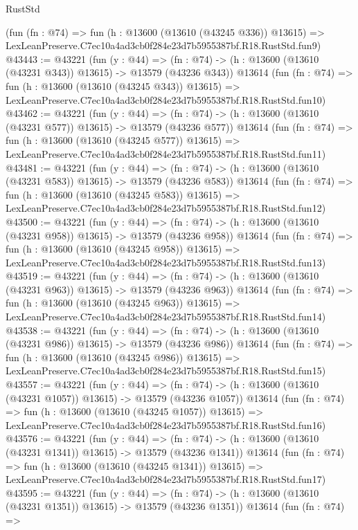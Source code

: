 \begin{lexlean}{RustStd}
\begin{coremodule}
    (fun (fn : @74) =>
    fun (h : @13600 (@13610 (@43245 @336)) @13615) =>
    LexLeanPreserve.C7ec10a4ad3cb0f284e23d7b5955387bf.R18.RustStd.fun9)
@43443 := @43221
    (fun (y : @44) =>
    (fn : @74) -> (h : @13600 (@13610 (@43231 @343)) @13615) -> @13579 (@43236 @343))
    @13614
    (fun (fn : @74) =>
    fun (h : @13600 (@13610 (@43245 @343)) @13615) =>
    LexLeanPreserve.C7ec10a4ad3cb0f284e23d7b5955387bf.R18.RustStd.fun10)
@43462 := @43221
    (fun (y : @44) =>
    (fn : @74) -> (h : @13600 (@13610 (@43231 @577)) @13615) -> @13579 (@43236 @577))
    @13614
    (fun (fn : @74) =>
    fun (h : @13600 (@13610 (@43245 @577)) @13615) =>
    LexLeanPreserve.C7ec10a4ad3cb0f284e23d7b5955387bf.R18.RustStd.fun11)
@43481 := @43221
    (fun (y : @44) =>
    (fn : @74) -> (h : @13600 (@13610 (@43231 @583)) @13615) -> @13579 (@43236 @583))
    @13614
    (fun (fn : @74) =>
    fun (h : @13600 (@13610 (@43245 @583)) @13615) =>
    LexLeanPreserve.C7ec10a4ad3cb0f284e23d7b5955387bf.R18.RustStd.fun12)
@43500 := @43221
    (fun (y : @44) =>
    (fn : @74) -> (h : @13600 (@13610 (@43231 @958)) @13615) -> @13579 (@43236 @958))
    @13614
    (fun (fn : @74) =>
    fun (h : @13600 (@13610 (@43245 @958)) @13615) =>
    LexLeanPreserve.C7ec10a4ad3cb0f284e23d7b5955387bf.R18.RustStd.fun13)
@43519 := @43221
    (fun (y : @44) =>
    (fn : @74) -> (h : @13600 (@13610 (@43231 @963)) @13615) -> @13579 (@43236 @963))
    @13614
    (fun (fn : @74) =>
    fun (h : @13600 (@13610 (@43245 @963)) @13615) =>
    LexLeanPreserve.C7ec10a4ad3cb0f284e23d7b5955387bf.R18.RustStd.fun14)
@43538 := @43221
    (fun (y : @44) =>
    (fn : @74) -> (h : @13600 (@13610 (@43231 @986)) @13615) -> @13579 (@43236 @986))
    @13614
    (fun (fn : @74) =>
    fun (h : @13600 (@13610 (@43245 @986)) @13615) =>
    LexLeanPreserve.C7ec10a4ad3cb0f284e23d7b5955387bf.R18.RustStd.fun15)
@43557 := @43221
    (fun (y : @44) =>
    (fn : @74) -> (h : @13600 (@13610 (@43231 @1057)) @13615) -> @13579 (@43236 @1057))
    @13614
    (fun (fn : @74) =>
    fun (h : @13600 (@13610 (@43245 @1057)) @13615) =>
    LexLeanPreserve.C7ec10a4ad3cb0f284e23d7b5955387bf.R18.RustStd.fun16)
@43576 := @43221
    (fun (y : @44) =>
    (fn : @74) -> (h : @13600 (@13610 (@43231 @1341)) @13615) -> @13579 (@43236 @1341))
    @13614
    (fun (fn : @74) =>
    fun (h : @13600 (@13610 (@43245 @1341)) @13615) =>
    LexLeanPreserve.C7ec10a4ad3cb0f284e23d7b5955387bf.R18.RustStd.fun17)
@43595 := @43221
    (fun (y : @44) =>
    (fn : @74) -> (h : @13600 (@13610 (@43231 @1351)) @13615) -> @13579 (@43236 @1351))
    @13614
    (fun (fn : @74) =>

\end{coremodule}
\end{lexlean}
